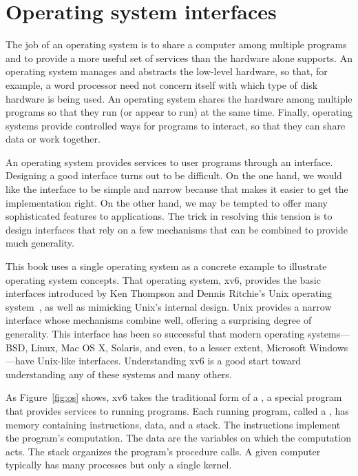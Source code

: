 \chapter{Operating system interfaces}
\label{CH:UNIX}

The job of an operating system is to share a computer among
multiple programs and to provide a more useful set of services
than the hardware alone supports.
An operating system manages and abstracts
the low-level hardware, so that, for example,
a word processor need not concern itself with which type
of disk hardware is being used.
An operating system shares the hardware among multiple programs so
that they run (or appear to run) at the same time.
Finally, operating systems provide controlled ways for programs
to interact, so that they can share data or work together.

An operating system provides services to user programs through an interface.
Designing a good interface turns out to be
difficult.  On the one hand, we would like the interface to be
simple and narrow because that makes it easier to get the
implementation right.  On the other hand,
we may be tempted to offer many sophisticated features to applications.
The trick in
resolving this tension is to design interfaces that rely on a few
mechanisms that can be combined to provide much generality.

This book uses a single operating system as a concrete example to
illustrate operating system concepts.  That operating system,
xv6, provides the basic interfaces introduced by Ken Thompson and
Dennis Ritchie's Unix operating system~\cite{unix}, as well as mimicking Unix's
internal design.  Unix provides a
narrow interface whose mechanisms combine well, offering a surprising
degree of generality.  This interface has been so successful that
modern operating systems—BSD, Linux, Mac OS X, Solaris, and even, to a
lesser extent, Microsoft Windows—have Unix-like interfaces.
Understanding xv6 is a good start toward understanding any of these
systems and many others.

As 
Figure~\ref{fig:os} shows,
xv6 takes the traditional form of a
,
a special program that provides
services to running programs.
Each running program, called a
,
has memory containing instructions, data, and a stack. The
instructions implement the
program's computation.  The data are the variables on which
the computation acts. The stack organizes the program's procedure calls.
A given computer typically has many processes but only a single
kernel.

